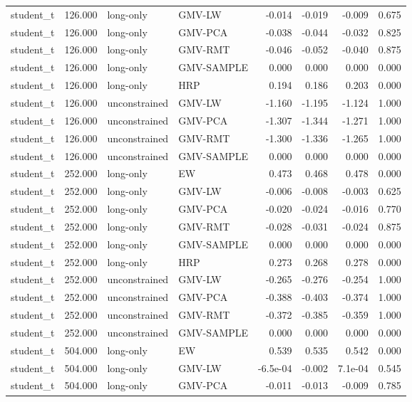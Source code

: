 \begin{table}[t]
{\begin{tabular}{lrllrrrr}
student\_t & 126.000 & long-only & GMV-LW & -0.014 & -0.019 & -0.009 & 0.675 \\
student\_t & 126.000 & long-only & GMV-PCA & -0.038 & -0.044 & -0.032 & 0.825 \\
student\_t & 126.000 & long-only & GMV-RMT & -0.046 & -0.052 & -0.040 & 0.875 \\
student\_t & 126.000 & long-only & GMV-SAMPLE & 0.000 & 0.000 & 0.000 & 0.000 \\
student\_t & 126.000 & long-only & HRP & 0.194 & 0.186 & 0.203 & 0.000 \\
student\_t & 126.000 & unconstrained & GMV-LW & -1.160 & -1.195 & -1.124 & 1.000 \\
student\_t & 126.000 & unconstrained & GMV-PCA & -1.307 & -1.344 & -1.271 & 1.000 \\
student\_t & 126.000 & unconstrained & GMV-RMT & -1.300 & -1.336 & -1.265 & 1.000 \\
student\_t & 126.000 & unconstrained & GMV-SAMPLE & 0.000 & 0.000 & 0.000 & 0.000 \\
student\_t & 252.000 & long-only & EW & 0.473 & 0.468 & 0.478 & 0.000 \\
student\_t & 252.000 & long-only & GMV-LW & -0.006 & -0.008 & -0.003 & 0.625 \\
student\_t & 252.000 & long-only & GMV-PCA & -0.020 & -0.024 & -0.016 & 0.770 \\
student\_t & 252.000 & long-only & GMV-RMT & -0.028 & -0.031 & -0.024 & 0.875 \\
student\_t & 252.000 & long-only & GMV-SAMPLE & 0.000 & 0.000 & 0.000 & 0.000 \\
student\_t & 252.000 & long-only & HRP & 0.273 & 0.268 & 0.278 & 0.000 \\
student\_t & 252.000 & unconstrained & GMV-LW & -0.265 & -0.276 & -0.254 & 1.000 \\
student\_t & 252.000 & unconstrained & GMV-PCA & -0.388 & -0.403 & -0.374 & 1.000 \\
student\_t & 252.000 & unconstrained & GMV-RMT & -0.372 & -0.385 & -0.359 & 1.000 \\
student\_t & 252.000 & unconstrained & GMV-SAMPLE & 0.000 & 0.000 & 0.000 & 0.000 \\
student\_t & 504.000 & long-only & EW & 0.539 & 0.535 & 0.542 & 0.000 \\
student\_t & 504.000 & long-only & GMV-LW & -6.5e-04 & -0.002 & 7.1e-04 & 0.545 \\
student\_t & 504.000 & long-only & GMV-PCA & -0.011 & -0.013 & -0.009 & 0.785 \\

\end{tabular}}
\end{table}

